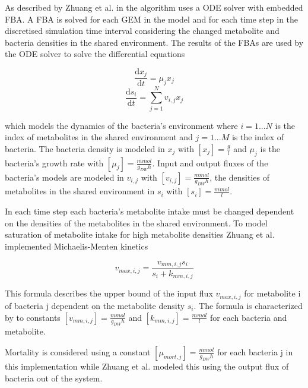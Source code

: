 As described by Zhuang et al. in \cite{zhuang_genome-scale_2011} the algorithm uses a ODE solver with embedded FBA. A FBA is solved
for each GEM in the model and for each time step in the discretised simulation time interval considering the changed metabolite and
bacteria densities in the shared environment. The results of the FBAs are used by the ODE solver to solve the differential equations

\begin{equation} \label{eq:diff_eq_x}
 \frac{\mathrm d x_j}{\mathrm d t} = \mu_j x_j
\end{equation}
\begin{equation} \label{eq:diff_eq_s}
 \frac{\mathrm d s_i}{\mathrm d t} = \displaystyle\sum_{j=1}^{N} v_{i,j} x_j
\end{equation}

which models the dynamics of the bacteria's environment \cite{zhuang_design_2012} where $i = 1...N$ is the index of metabolites in the shared environment and $j = 1...M$ is the index of bacteria.
The bacteria density is modeled in $x_j$ with $\left[ x_j \right] = \frac{g}{l}$ and $\mu_j$ is the bacteria's growth rate with $\left[ \mu_j \right] = \frac{mmol}{g_{DW} h}$.
Input and output fluxes of the bacteria's models are modeled in $v_{i,j}$ with $\left[ v_{i,j} \right] = \frac{mmol}{g_{DW} h}$,
the densities of metabolites in the shared environment in $s_i$ with $\left[ s_i \right] = \frac{mmol}{l}$.

In each time step each bacteria's metabolite intake must be changed dependent on the densities of the metabolites in the shared environment.
To model saturation of metabolite intake for high metabolite densities Zhuang et al. implemented Michaelis-Menten kinetics \cite{johnson2011original}

\begin{equation} \label{eq:michaelis-menten}
 v_{max,i,j} = \frac{v_{mm,i,j} s_i}{s_i + k_{mm,i,j}}
\end{equation}

This formula describes the upper bound of the input flux $v_{max,i,j}$ for metabolite i of bacteria j dependent on the metabolite density
$s_i$. The formula is characterized by to constants $\left[ v_{mm,i,j} \right] = \frac{mmol}{g_{DW} h}$ and $\left[ k_{mm,i,j} \right] = \frac{mmol}{l}$
for each bacteria and metabolite.

Mortality is considered using a constant $\left[ \mu_{mort,j} \right] = \frac{mmol}{g_{DW} h}$ for each bacteria j in this implementation while Zhuang et al. modeled this
using the output flux of bacteria out of the system.

